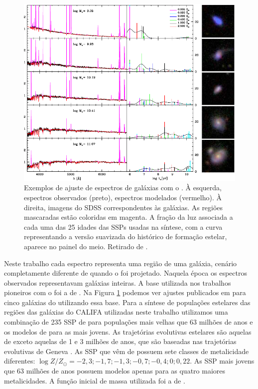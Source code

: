 \begin{figure}
	\includegraphics[width=1.0\textwidth]{figuras/starlightfit.pdf}
	\caption[Exemplos de ajuste de espectro com o \starlight]
	{Exemplos de ajuste de espectros de galáxias com o \starlight. À esquerda, espectros observados (preto), espectros modelados (vermelho). À direita, imagens do SDSS correspondentes às galáxias. As regiões mascaradas estão coloridas em magenta. A fração da luz associada a cada uma das 25 idades das SSPs usadas na síntese, com a curva representando a versão suavizada do histórico de formação estelar, aparece no painel do meio. Retirado de \citet{Asari.etal.2007a}.}
	\label{fig:StarlightSpectrumSample}
\end{figure}

Neste trabalho cada espectro representa uma região de uma galáxia, cenário completamente diferente de quando o \starlight foi projetado. Naquela época os espectros observados representavam galáxias inteiras. A base utilizada nos trabalhos pioneiros com o \starlight foi a de \citet{Bruzual.Charlot.2003}. Na Figura \ref{fig:StarlightSpectrumSample} podemos ver ajustes publicados em \citet{Asari.etal.2007a} para cinco galáxias do \SDSS utilizando essa base. Para a síntese de populações estelares das regiões das galáxias do CALIFA utilizadas neste trabalho utilizamos uma combinação de 235 SSP de \citet{Vazdekis2010} para populações mais velhas que 63 milhões de anos e os modelos de \citet{Gonzalezdelgado2005} para as mais jovens. As trajetórias evolutivas estelares são aquelas de \citet{Girardi2000} exceto aquelas de 1 e 3 milhões de anos, que são baseadas nas trajetórias evolutivas de Geneva \citep{Schaller.etal.1992a,Schaerer.etal.1993a,Charbonnel.etal.1993, Schaerer.etal.1993b}. As SSP que vêm de \citet{Vazdekis2010} possuem sete classes de metalicidade diferentes: $\log Z/Z_{\odot} = -2,3; -1,7; -1,3; -0,7; -0,4; 0; 0,22$. As SSP mais jovens que 63 milhões de anos possuem modelos apenas para as quatro maiores metalicidades. A função inicial de massa utilizada foi a de \citet{Salpeter.1955a}.

